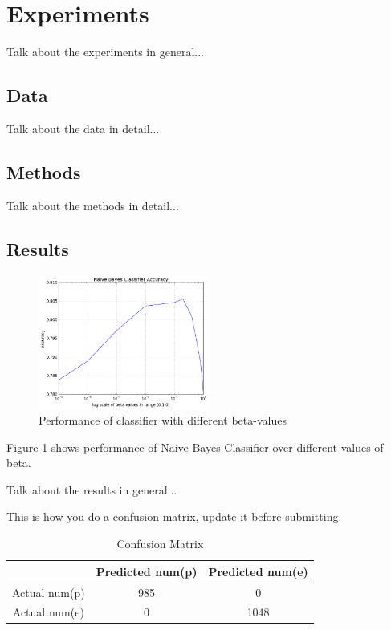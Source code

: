 \documentclass{IEEEtran}
\begin{document}
\section{Experiments}
Talk about the experiments in general...

\subsection{Data}
Talk about the data in detail...

\subsection{Methods}
Talk about the methods in detail...

\subsection{Results}

\begin{figure}
  \includegraphics[width=0.5\textwidth, natwidth=80,natheight=80]{betavsacc.png}
  \caption{Performance of classifier with different beta-values}
  \label{fig:betavsacc}
\end{figure}

Figure \ref{fig:betavsacc} shows performance of Naive Bayes Classifier over different values of beta.

Talk about the results in general...

This is how you do a confusion matrix, update it before submitting.
\begin{table}[ht]
  \caption{Confusion Matrix}
  \centering
  \begin{tabular}{c c c }
  \hline\hline
                & Predicted num(p) & Predicted num(e) \\ [0.5ex]
  \hline
  Actual num(p) &              985 &                0 \\
  Actual num(e) &                0 &             1048 \\ [1ex]
  \hline
  \end{tabular}
  \label{table:nonlin}
\end{table}
\end{document}
